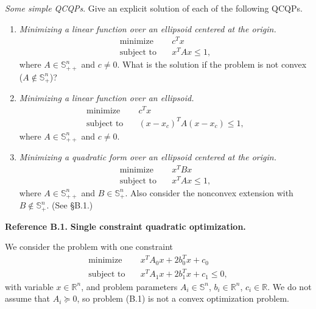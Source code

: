 \documentclass[11pt,letter,notitlepage]{article}
\theoremstyle{definition}
\begin{document}
\newpage

\begin{exercise}
\textit{Some simple QCQPs}. Give an explicit solution of each of the following QCQPs.

\begin{enumerate}[label=(\alph*)]
    \item \textit{Minimizing a linear function over an ellipsoid centered at the origin.}
    \[
    \begin{aligned}
    \text{minimize} \quad & c^T x \\
    \text{subject to} \quad & x^T A x \le 1,
    \end{aligned}
    \]
    where $A \in \mathbb{S}_{++}^n$ and $c \ne 0$.
    What is the solution if the problem is not convex
    ($A \notin \mathbb{S}_{+}^n$)?

    \item \textit{Minimizing a linear function over an ellipsoid.}
    \[
    \begin{aligned}
    \text{minimize} \quad & c^T x \\
    \text{subject to} \quad & (x-x_c)^T A (x-x_c) \le 1,
    \end{aligned}
    \]
    where $A \in \mathbb{S}_{++}^n$ and $c \ne 0$.

    \item \textit{Minimizing a quadratic form over an ellipsoid centered at the origin.}
    \[
    \begin{aligned}
    \text{minimize} \quad & x^T B x \\
    \text{subject to} \quad & x^T A x \le 1,
    \end{aligned}
    \]
    where $A \in \mathbb{S}_{++}^n$ and $B \in \mathbb{S}_{+}^n$.
    Also consider the nonconvex extension with $B \notin \mathbb{S}_{+}^n$.
    (See \S B.1.)
\end{enumerate}

\vspace{0.5em}
\noindent\textbf{Reference B.1.} \textbf{Single constraint quadratic optimization.}

We consider the problem with one constraint
\[
\begin{aligned}
\text{minimize} \quad & x^T A_0 x + 2b_0^T x + c_0 \\
\text{subject to} \quad & x^T A_1 x + 2b_1^T x + c_1 \le 0,
\end{aligned}
\tag{B.1}
\]
with variable $x \in \mathbb{R}^n$, and problem parameters
$A_i \in \mathbb{S}^n$, $b_i \in \mathbb{R}^n$, $c_i \in \mathbb{R}$.
We do not assume that $A_i \succeq 0$, so problem (B.1) is not a convex optimization problem.
\end{exercise}
\end{document}
